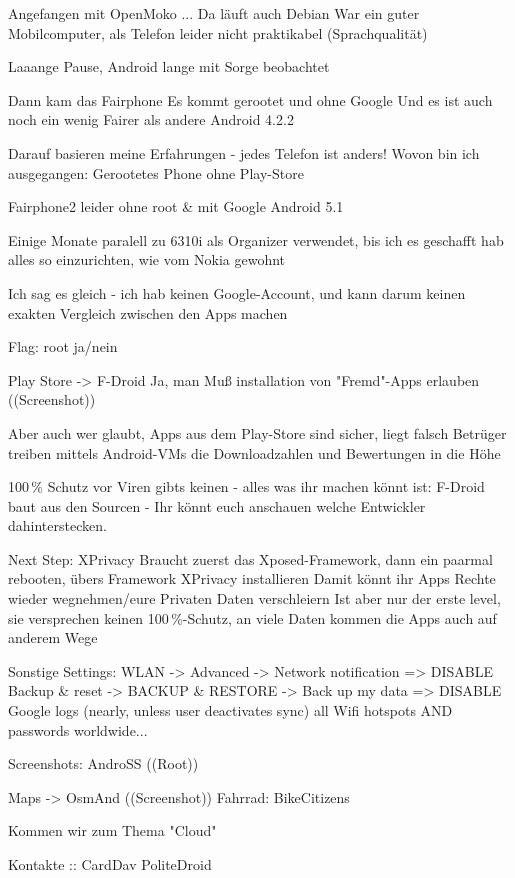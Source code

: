 \documentclass{beamer}
\begin{document}
Angefangen mit OpenMoko ... Da läuft auch Debian
  War ein guter Mobilcomputer, als Telefon leider nicht praktikabel (Sprachqualität)

Laaange Pause, Android lange mit Sorge beobachtet

Dann kam das Fairphone
  Es kommt gerootet und ohne Google
  Und es ist auch noch ein wenig Fairer als andere
  Android 4.2.2

    Darauf basieren meine Erfahrungen - jedes Telefon ist anders!
  Wovon bin ich ausgegangen: Gerootetes Phone ohne Play-Store

Fairphone2 
  leider ohne root \& mit Google
  Android 5.1

Einige Monate paralell zu 6310i als Organizer verwendet, bis ich es geschafft hab alles so einzurichten, wie vom Nokia gewohnt


Ich sag es gleich - ich hab keinen Google-Account, und kann darum keinen exakten Vergleich zwischen den Apps machen

Flag: root ja/nein 


Play Store -> F-Droid
  Ja, man Muß installation von "Fremd"-Apps erlauben ((Screenshot))

  Aber auch wer glaubt, Apps aus dem Play-Store sind sicher, liegt falsch
  Betrüger treiben mittels Android-VMs die Downloadzahlen und Bewertungen in die Höhe

  100\,\% Schutz vor Viren gibts keinen - alles was ihr machen könnt ist: 
    F-Droid baut aus den Sourcen - Ihr könnt euch anschauen welche Entwickler dahinterstecken.
    

Next Step: XPrivacy
  Braucht zuerst das Xposed-Framework, dann ein paarmal rebooten, übers Framework XPrivacy installieren
  Damit könnt ihr Apps Rechte wieder wegnehmen/eure Privaten Daten verschleiern
  Ist aber nur der erste level, sie versprechen keinen 100\,\%-Schutz, an viele Daten kommen die Apps auch auf anderem Wege

Sonstige Settings:
  WLAN -> Advanced -> Network notification => DISABLE
  Backup & reset -> BACKUP & RESTORE -> Back up my data => DISABLE
  Google logs (nearly, unless user deactivates sync) all Wifi hotspots AND passwords worldwide...

  Screenshots: AndroSS ((Root))

  Maps -> OsmAnd ((Screenshot))
    Fahrrad: BikeCitizens

  Kommen wir zum Thema "Cloud"

  Kontakte :: CardDav
    PoliteDroid
\end{document}
